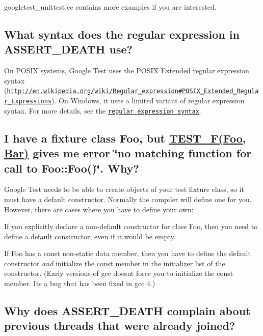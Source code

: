 {\ttfamily googletest\+\_\+unittest.\+cc} contains more examples if you are interested.

\subsection*{What syntax does the regular expression in A\+S\+S\+E\+R\+T\+\_\+\+D\+E\+A\+TH use?}

On P\+O\+S\+IX systems, Google Test uses the P\+O\+S\+IX Extended regular expression syntax (\href{http://en.wikipedia.org/wiki/Regular_expression#POSIX_Extended_Regular_Expressions}{\tt http\+://en.\+wikipedia.\+org/wiki/\+Regular\+\_\+expression\#\+P\+O\+S\+I\+X\+\_\+\+Extended\+\_\+\+Regular\+\_\+\+Expressions}). On Windows, it uses a limited variant of regular expression syntax. For more details, see the \href{AdvancedGuide.md#Regular_Expression_Syntax}{\tt regular expression syntax}.

\subsection*{I have a fixture class Foo, but \hyperlink{gtest_8h_a0ee66d464d1a06c20c1929cae09d8758}{T\+E\+S\+T\+\_\+\+F(\+Foo, Bar)} gives me error \char`\"{}no matching function for call to Foo\+::\+Foo()\char`\"{}. Why?}

Google Test needs to be able to create objects of your test fixture class, so it must have a default constructor. Normally the compiler will define one for you. However, there are cases where you have to define your own\+:
\begin{DoxyItemize}
\item If you explicitly declare a non-\/default constructor for class {\ttfamily Foo}, then you need to define a default constructor, even if it would be empty.
\item If {\ttfamily Foo} has a const non-\/static data member, then you have to define the default constructor {\itshape and} initialize the const member in the initializer list of the constructor. (Early versions of {\ttfamily gcc} doesn\textquotesingle{}t force you to initialize the const member. It\textquotesingle{}s a bug that has been fixed in {\ttfamily gcc 4}.)
\end{DoxyItemize}

\subsection*{Why does A\+S\+S\+E\+R\+T\+\_\+\+D\+E\+A\+TH complain about previous threads that were already joined?}

